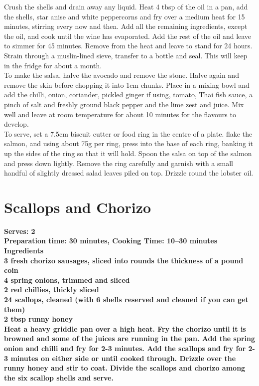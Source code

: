 \documentclass[18pt, oneside]{book}
\begin{document}
Crush the shells and drain away any liquid. Heat 4 tbsp of the oil in a pan, add the shells, star anise and white peppercorns and fry over a medium heat for 15 minutes, stirring every now and then. Add all the remaining ingredients, except the oil, and cook until the wine has evaporated. Add the rest of the oil and leave to simmer for 45 minutes. Remove from the heat and leave to stand for 24 hours. Strain through a muslin-lined sieve, transfer to a bottle and seal. This will keep in the fridge for about a month. \\

To make the salsa, halve the avocado and remove the stone. Halve again and remove the skin before chopping it into 1cm chunks. Place in a mixing bowl and add the chilli, onion, coriander, pickled ginger if using, tomato, Thai fish sauce, a pinch of salt and freshly ground black pepper and the lime zest and juice. Mix well and leave at room temperature for about 10 minutes for the flavours to develop. \\ 

To serve, set a 7.5cm biscuit cutter or food ring in the centre of a plate. flake the salmon, and using about 75g per ring, press into the base of each ring, banking it up the sides of the ring so that it will hold. Spoon the salsa on top of the salmon and press down lightly. Remove the ring carefully and garnish with a small handful of slightly dressed salad leaves piled on top. Drizzle round the lobster oil. \\


\section{Scallops and Chorizo}
\label{scallopsandchorizo}
\textbf{Serves: 2} \\
\textbf{Preparation time: 30 minutes, Cooking Time: 10--30 minutes} \\

\bf{Ingredients} \normalfont \\
3 fresh chorizo sausages, sliced into rounds the thickness of a pound coin \\
4 spring onions, trimmed and sliced \\
2 red chillies, thickly sliced \\
24 scallops, cleaned (with 6 shells reserved and cleaned if you can get them) \\
2 tbsp runny honey \\

Heat a heavy griddle pan over a high heat. Fry the chorizo until it is browned and some of the juices are running in the pan. Add the spring onion and chilli and fry for 2-3 minutes. Add the scallops and fry for 2-3 minutes on either side or until cooked through. Drizzle over the runny honey and stir to coat. Divide the scallops and chorizo among the six scallop shells and serve.
\end{document}
